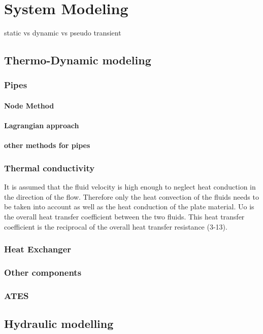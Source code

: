 %
\chapter{System Modeling}\label{chap::sysmodel}
static vs dynamic vs pseudo transient



\section{Thermo-Dynamic modeling}
\subsection{Pipes}
\subsubsection{Node Method}
\subsubsection{Lagrangian approach}
\subsubsection{other methods for pipes}
\subsection{Thermal conductivity}
It is assumed that the fluid velocity is high enough to neglect heat conduction in the direction of the flow. Therefore only the heat convection of the fluids needs to be taken into account as well as the heat conduction of the plate material. Uo is the overall heat transfer coefficient between the two fluids. This heat transfer coefficient is the reciprocal of the overall heat transfer resistance (3-13). 
\subsection{Heat Exchanger}
\subsection{Other components}
\subsection{ATES}
\section{Hydraulic modelling}
